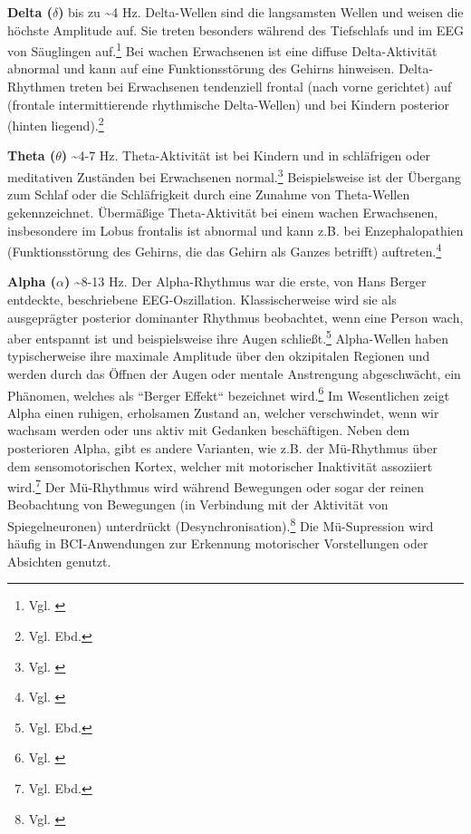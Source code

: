 \textbf{Delta ($\delta$)} bis zu \textasciitilde 4 Hz. Delta-Wellen sind die langsamsten Wellen und weisen die höchste Amplitude auf. Sie treten besonders während des Tiefschlafs und im EEG von Säuglingen auf.\footnote{Vgl. \cite{jadeja2021}} Bei wachen Erwachsenen ist eine diffuse Delta-Aktivität abnormal und kann auf eine Funktionsstörung des Gehirns hinweisen. Delta-Rhythmen treten bei Erwachsenen tendenziell frontal (nach vorne gerichtet) auf (frontale intermittierende rhythmische Delta-Wellen) und bei Kindern posterior (hinten liegend).\footnote{Vgl. Ebd.}

\textbf{Theta ($\theta$)} \textasciitilde 4-7 Hz. Theta-Aktivität ist bei Kindern und in schläfrigen oder meditativen Zuständen bei Erwachsenen normal.\footnote{Vgl. \cite{wiki_eeg_english}} Beispielsweise ist der Übergang zum Schlaf oder die Schläfrigkeit durch eine Zunahme von Theta-Wellen gekennzeichnet. Übermäßige Theta-Aktivität bei einem wachen Erwachsenen, insbesondere im Lobus frontalis ist abnormal und kann z.B. bei Enzephalopathien (Funktionsstörung des Gehirns, die das Gehirn als Ganzes betrifft) auftreten.\footnote{Vgl. \cite{jadeja2021}}

\textbf{Alpha ($\alpha$)} \textasciitilde 8-13 Hz. Der Alpha-Rhythmus war die erste, von Hans Berger entdeckte, beschriebene EEG-Oszillation. Klassischerweise wird sie als ausgeprägter posterior dominanter Rhythmus beobachtet, wenn eine Person wach, aber entspannt ist und beispielsweise ihre Augen schließt.\footnote{Vgl. Ebd.} Alpha-Wellen haben typischerweise ihre maximale Amplitude über den okzipitalen Regionen und werden durch das Öffnen der Augen oder mentale Anstrengung abgeschwächt, ein Phänomen, welches als “Berger Effekt“ bezeichnet wird.\footnote{Vgl. \cite{jensen2010}} Im Wesentlichen zeigt Alpha einen ruhigen, erholsamen Zustand an, welcher verschwindet, wenn wir wachsam werden oder uns aktiv mit Gedanken beschäftigen. Neben dem posterioren Alpha, gibt es andere Varianten, wie z.B. der Mü-Rhythmus über dem sensomotorischen Kortex, welcher mit motorischer Inaktivität assoziiert wird.\footnote{Vgl. Ebd.} Der Mü-Rhythmus wird während Bewegungen oder sogar der reinen Beobachtung von Bewegungen (in Verbindung mit der Aktivität von Spiegelneuronen) unterdrückt (Desynchronisation).\footnote{Vgl. \cite{jadeja2021}} Die Mü-Supression wird häufig in BCI-Anwendungen zur Erkennung motorischer Vorstellungen oder Absichten genutzt. 

